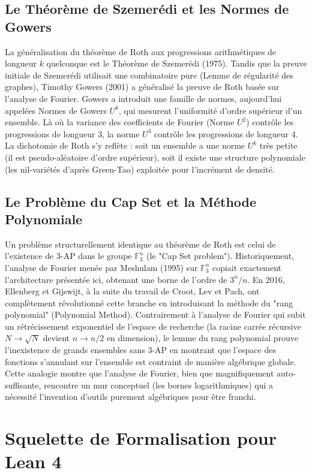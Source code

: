 \documentclass[12pt, a4paper]{article}
\begin{document}
\subsection{Le Théorème de Szemerédi et les Normes de Gowers}
La généralisation du théorème de Roth aux progressions arithmétiques de longueur $k$ quelconque est le Théorème de Szemerédi (1975).
Tandis que la preuve initiale de Szemerédi utilisait une combinatoire pure (Lemme de régularité des graphes), Timothy Gowers (2001) a généralisé la preuve de Roth basée sur l'analyse de Fourier. Gowers a introduit une famille de normes, aujourd'hui appelées Normes de Gowers $U^k$, qui mesurent l'uniformité d'ordre supérieur d'un ensemble.
Là où la variance des coefficients de Fourier (Norme $U^2$) contrôle les progressions de longueur 3, la norme $U^3$ contrôle les progressions de longueur 4. La dichotomie de Roth s'y reflète : soit un ensemble a une norme $U^k$ très petite (il est pseudo-aléatoire d'ordre supérieur), soit il existe une structure polynomiale (les nil-variétés d'après Green-Tao) exploitée pour l'incrément de densité.

\subsection{Le Problème du Cap Set et la Méthode Polynomiale}
Un problème structurellement identique au théorème de Roth est celui de l'existence de 3-AP dans le groupe $\mathbb{F}_3^n$ (le "Cap Set problem"). Historiquement, l'analyse de Fourier menée par Meshulam (1995) sur $\mathbb{F}_3^n$ copiait exactement l'architecture présentée ici, obtenant une borne de l'ordre de $3^n / n$.
En 2016, Ellenberg et Gijswijt, à la suite du travail de Croot, Lev et Pach, ont complètement révolutionné cette branche en introduisant la méthode du "rang polynomial" (Polynomial Method). Contrairement à l'analyse de Fourier qui subit un rétrécissement exponentiel de l'espace de recherche (la racine carrée récursive $N \to \sqrt{N}$ devient $n \to n/2$ en dimension), le lemme du rang polynomial prouve l'inexistence de grands ensembles sans 3-AP en montrant que l'espace des fonctions s'annulant sur l'ensemble est contraint de manière algébrique globale. Cette analogie montre que l'analyse de Fourier, bien que magnifiquement auto-suffisante, rencontre un mur conceptuel (les bornes logarithmiques) qui a nécessité l'invention d'outils purement algébriques pour être franchi.

\section{Squelette de Formalisation pour Lean 4}
\end{document}
